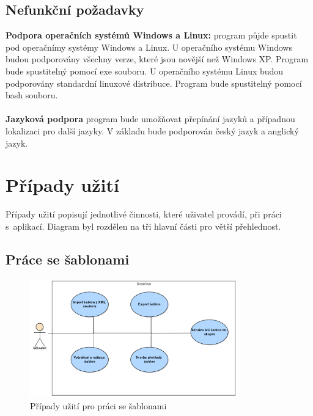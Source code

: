 \documentclass[thesis=B,czech]{resources/FITthesis}[2012/06/26]
\begin{document}
\subsection{Nefunkční požadavky}

\textbf{Podpora operačních systémů Windows a Linux:} program půjde spustit pod operačnímy systémy Windows a Linux. U operačního systému Windows budou podporovány všechny verze, které jsou novější než Windows XP. Program bude spustitelný pomocí exe souboru. U operačního systému Linux budou podporovány standardní linuxové distribuce. Program bude spustitelný pomocí bash souboru.\\
\\
\textbf{Jazyková podpora} program bude umožňovat přepínání jazyků a případnou lokalizaci pro další jazyky. V základu bude podporován český jazyk a anglický jazyk.



	\section{Případy užití}
Případy užití popisují jednotlivé činnosti, které uživatel provádí, při práci s~aplikací. Diagram byl rozdělen na tři hlavní části pro větší přehlednost.
\subsection{Práce se šablonami}
\begin{figure}\centering
	\includegraphics[width=0.8\textwidth]{images/usecase_sablony.pdf}
	\caption[Případy užití pro šablony]{Případy užití pro práci se šablonami}\label{fig:uc_sablony}
\end{figure}
\end{document}
